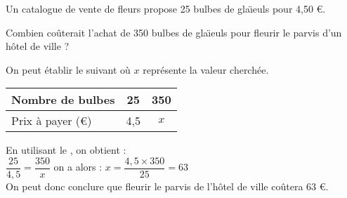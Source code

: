 \begin{myex}
	Un catalogue de vente de fleurs propose 25 bulbes de gla\"{\i}euls pour 4,50 €.
	
	Combien coûterait l'achat de 350 bulbes de gla\"{\i}euls pour fleurir le parvis d'un hôtel de ville ?\\
	
	\mysp
	
	On peut établir le  suivant où $x$ représente la valeur cherchée.
	
	\begin{center}
		\begin{tabular}{|@{\ }l@{\ }|@{\ }c@{\ }|@{\ }c@{\ }|}
			\hline
			Nombre de bulbes & 25 & 350  \\ \hline
			Prix à payer (€) & 4,5 & $x$  \\ \hline
		\end{tabular}
	\end{center}
	
	En utilisant le , on obtient : \\
	
	$\dfrac{25}{4,5} = \dfrac{350}{x}$ on a alors : $x = \dfrac{4,5 \times 350}{25} = 63$\\
	
	On peut donc conclure que fleurir le parvis de l'hôtel de ville coûtera 63 €.
\end{myex}